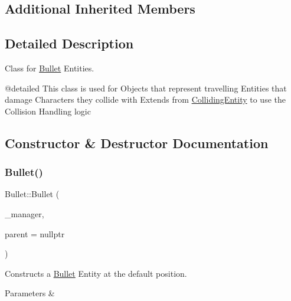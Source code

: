 \subsection*{Additional Inherited Members}


\subsection{Detailed Description}
Class for \mbox{\hyperlink{class_bullet}{Bullet}} Entities. 

@detailed This class is used for Objects that represent travelling Entities that damage Characters they collide with Extends from \mbox{\hyperlink{class_colliding_entity}{Colliding\+Entity}} to use the Collision Handling logic 

\subsection{Constructor \& Destructor Documentation}
\mbox{\label{class_bullet_a8f9c05192908b186a3c01a74a58cb15c}} 
\subsubsection{\texorpdfstring{Bullet()}{Bullet()}\hspace{0.1cm}{\footnotesize\ttfamily [1/3]}}
{\footnotesize\ttfamily Bullet\+::\+Bullet (\begin{DoxyParamCaption}\item[{\mbox{\hyperlink{class_game_manager}{Game\+Manager}} $\ast$}]{\+\_\+manager,  }\item[{\mbox{\hyperlink{class_game_entity}{Game\+Entity}} $\ast$}]{parent = {\ttfamily nullptr} }\end{DoxyParamCaption})}



Constructs a \mbox{\hyperlink{class_bullet}{Bullet}} Entity at the default position. 


\begin{DoxyParams}{Parameters}
{\em } & \\
\hline
\end{DoxyParams}
\mbox{\label{class_bullet_a0b4ea3318d4f91f8d74515e486765e19}} 
